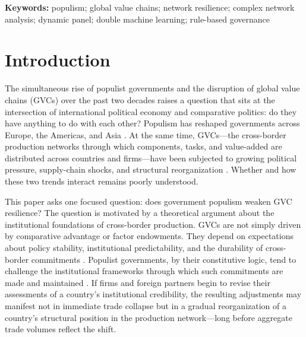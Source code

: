 \documentclass[12pt]{article}
\begin{document}
\begin{titlepage}
\vspace{0.5cm}
\noindent \textbf{Keywords:} populism; global value chains; network resilience; complex network analysis; dynamic panel; double machine learning; rule-based governance

\end{titlepage}

\newpage
\setcounter{page}{1}

\section{Introduction}

The simultaneous rise of populist governments and the disruption of global value chains (GVCs) over the past two decades raises a question that sits at the intersection of international political economy and comparative politics: do they have anything to do with each other? Populism has reshaped governments across Europe, the Americas, and Asia \citep{norrisinglehart2019, muddekaltwasser2017, guriev2022}. At the same time, GVCs---the cross-border production networks through which components, tasks, and value-added are distributed across countries and firms---have been subjected to growing political pressure, supply-chain shocks, and structural reorganization \citep{antras2020, worldbank2020, oecd2021resilience}. Whether and how these two trends interact remains poorly understood.

This paper asks one focused question: does government populism weaken GVC resilience? The question is motivated by a theoretical argument about the institutional foundations of cross-border production. GVCs are not simply driven by comparative advantage or factor endowments. They depend on expectations about policy stability, institutional predictability, and the durability of cross-border commitments \citep{gereffi2005, antras2013, north1990}. Populist governments, by their constitutive logic, tend to challenge the institutional frameworks through which such commitments are made and maintained \citep{mudde2004, funke2020, bermeo2016}. If firms and foreign partners begin to revise their assessments of a country's institutional credibility, the resulting adjustments may manifest not in immediate trade collapse but in a gradual reorganization of a country's structural position in the production network---long before aggregate trade volumes reflect the shift.
\end{document}

